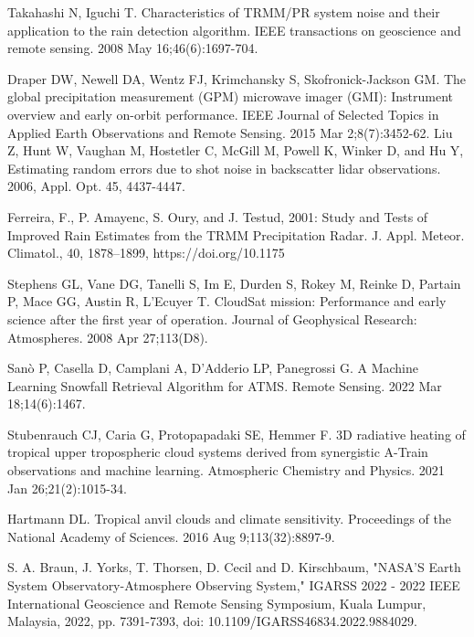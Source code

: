 \documentclass[12pt]{article}
\begin{document}
\begin{thebibliography}{999}

Takahashi N, Iguchi T. Characteristics of TRMM/PR system noise and their application to the rain detection algorithm. 
IEEE transactions on geoscience and remote sensing. 2008 May 16;46(6):1697-704.

Draper DW, Newell DA, Wentz FJ, Krimchansky S, Skofronick-Jackson GM. The global precipitation measurement (GPM) 
microwave imager (GMI): Instrument overview and early on-orbit performance. IEEE Journal of Selected Topics in 
Applied Earth Observations and Remote Sensing. 2015 Mar 2;8(7):3452-62.
Liu Z, Hunt W, Vaughan M, Hostetler C, McGill M, Powell K, Winker D, and  Hu Y, 
Estimating random errors due to shot noise in backscatter lidar observations. 2006, Appl. Opt. 45, 4437-4447.

Ferreira, F., P. Amayenc, S. Oury, and J. Testud, 2001: Study and Tests of Improved Rain Estimates from the TRMM Precipitation Radar. 
J. Appl. Meteor. Climatol., 40, 1878–1899, https://doi.org/10.1175

  Stephens GL, Vane DG, Tanelli S, Im E, Durden S, Rokey M, Reinke D, Partain P, 
  Mace GG, Austin R, L'Ecuyer T. CloudSat mission: Performance and early science 
  after the first year of operation. 
  Journal of Geophysical Research: Atmospheres. 2008 Apr 27;113(D8). 

  Sanò P, Casella D, Camplani A, D’Adderio LP, Panegrossi G. A Machine Learning
  Snowfall Retrieval Algorithm for ATMS. Remote Sensing. 
  2022 Mar 18;14(6):1467.

  Stubenrauch CJ, Caria G, Protopapadaki SE, Hemmer F. 3D radiative heating of 
  tropical upper tropospheric cloud systems derived from synergistic A-Train 
  observations and machine learning. 
  Atmospheric Chemistry and Physics. 2021 Jan 26;21(2):1015-34.

  Hartmann DL. Tropical anvil clouds and climate sensitivity. 
  Proceedings of the National Academy of Sciences. 2016 Aug 9;113(32):8897-9.

  S. A. Braun, J. Yorks, T. Thorsen, D. Cecil and D. Kirschbaum, 
  "NASA'S Earth System Observatory-Atmosphere Observing System," 
  IGARSS 2022 - 2022 IEEE International Geoscience and Remote Sensing Symposium, 
  Kuala Lumpur, 
  Malaysia, 2022, pp. 7391-7393, doi: 10.1109/IGARSS46834.2022.9884029.
  

\end{thebibliography}
\end{document}
